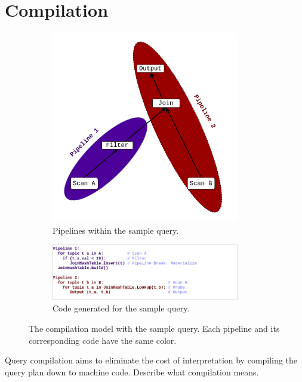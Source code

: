 \documentclass[12pt]{cmuthesis}
\begin{document}
\section{Compilation}
\begin{figure}[H]
\centering
\begin{subfigure}{.5\textwidth}
 \centering
 \includegraphics[width=0.9\textwidth]{images/Pipeline.png}
 \caption{Pipelines within the sample query.}
  \label{fig:pipeline_graph}
\end{subfigure}%
\begin{subfigure}{.5\textwidth}
 \centering
 \includegraphics[width=0.9\textwidth]{images/PipelineCode.png}
 \caption{Code generated for the sample query.}
  \label{fig:pipeline_code}
\end{subfigure}
\caption{The compilation model with the sample query. Each pipeline and its corresponding code have the same color.}
\label{fig:update_map_intro}
\end{figure}


Query compilation \cite{system_r, hique, hyper_llvm} aims to eliminate the cost of interpretation by compiling the query plan down to machine code.
{
\color{red}
Describe what compilation means.
}
\end{document}
